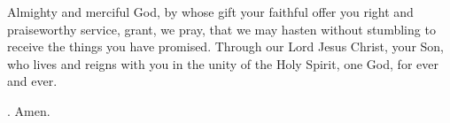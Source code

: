 \lettrine[lines=3]{A}{}lmighty and merciful God, by whose gift your faithful offer you right and praiseworthy service, grant, we pray, that we may hasten without stumbling to receive the things you have promised. Through our Lord Jesus Christ, your Son, who lives and reigns with you in the unity of the Holy Spirit, one God, for ever and ever. \par \Rbar. Amen.
